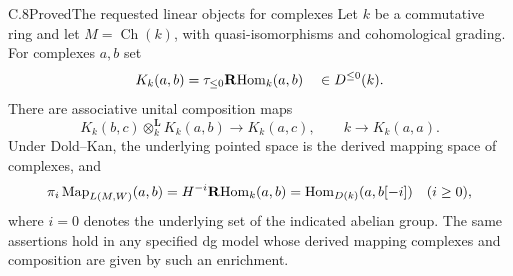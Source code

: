 \begin{result}{C.8}{Proved}{The requested linear objects for complexes}
Let $k$ be a commutative ring and let $M=\operatorname{Ch}(k)$, with quasi-isomorphisms and cohomological grading. For complexes $a,b$ set
\[
 K_k(a,b)=\tau_{\leq0}\mathbf R\!\operatorname{Hom}_k(a,b)\quad\in D^{\leq0}(k).
\]
There are associative unital composition maps
\[
 K_k(b,c)\otimes_k^{\mathbf L}K_k(a,b)\longrightarrow K_k(a,c),
 \qquad k\longrightarrow K_k(a,a).
\]
Under Dold--Kan, the underlying pointed space is the derived mapping space of complexes, and
\[
 \pi_i\operatorname{Map}_{L(M,W)}(a,b)=H^{-i}\mathbf R\!\operatorname{Hom}_k(a,b)
       =\operatorname{Hom}_{D(k)}(a,b[-i])\quad(i\geq0),
\]
where $i=0$ denotes the underlying set of the indicated abelian group. The same assertions hold in any specified dg model whose derived mapping complexes and composition are given by such an enrichment.
\end{result}
